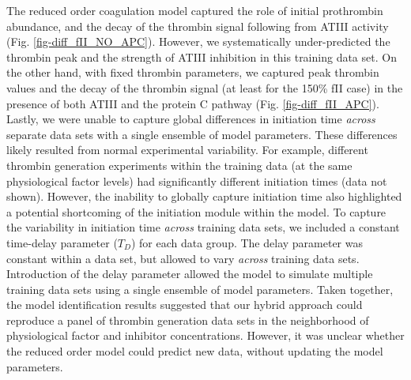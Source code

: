 \documentclass[12pt]{article}
\begin{document}
The reduced order coagulation model captured the role of initial prothrombin abundance, and the decay of the thrombin signal following from ATIII activity (Fig. \ref{fig-diff_fII_NO_APC}).
However, we systematically under-predicted the thrombin peak and the strength of ATIII inhibition in this training data set.
On the other hand, with fixed thrombin parameters, we captured peak thrombin values and the decay of the thrombin signal (at least for the 150\% fII case) in the presence
of both ATIII and the protein C pathway (Fig. \ref{fig-diff_fII_APC}). Lastly, we were unable to capture global differences in initiation time \textit{across} separate data 
sets with a single ensemble of model parameters. These differences likely resulted from normal experimental variability.
For example, different thrombin generation experiments within the 
training data (at the same physiological factor levels) had significantly different initiation times (data not shown). 
However, the inability to globally capture initiation time also highlighted a potential shortcoming of the initiation module within the model. 
To capture the variability in initiation time \textit{across} training data sets, we included a constant time-delay parameter ($T_{D}$) for each data group.
The delay parameter was constant within a data set, but allowed to vary \textit{across} training data sets. 
Introduction of the delay parameter allowed the model to simulate multiple training data sets using a single ensemble of model parameters.
Taken together, the model identification results suggested 
that our hybrid approach could reproduce a panel of thrombin generation data sets in the neighborhood of physiological factor and inhibitor concentrations.
However, it was unclear whether the reduced order model could predict new data, without updating the model parameters.
\end{document}
